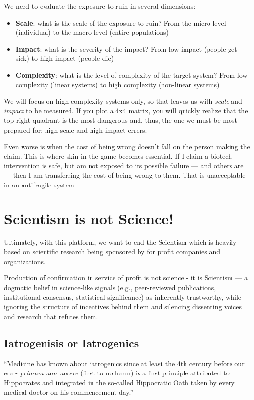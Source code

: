 \documentclass{article}
\begin{document}
We need to evaluate the exposure to ruin in several dimensions:

\begin{itemize}
	\item \textbf{Scale}: what is the scale of the exposure to ruin? From the micro level (individual) to the macro level (entire populations)
	\item \textbf{Impact}: what is the severity of the impact? From low-impact (people get sick) to high-impact (people die)
	\item \textbf{Complexity}: what is the level of complexity of the target system? From low complexity (linear systems) to high complexity (non-linear systems)
\end{itemize}

We will focus on high complexity systems only, so that leaves us with \textit{scale} and \textit{impact} to be measured.
If you plot a 4x4 matrix, you will quickly realize that the top right quadrant is the most dangerous and, thus, the one we must be most prepared for: high scale and high impact errors.

Even worse is when the cost of being wrong doesn't fall on the person making the claim. This is where skin in the game becomes essential. If I claim a biotech intervention is safe, but am not exposed to its possible failure — and others are — then I am transferring the cost of being wrong to them. That is unacceptable in an antifragile system.

\section{Scientism is not Science!}
Ultimately, with this platform, we want to end the Scientism which is heavily based on scientific research being sponsored by for profit companies and organizations.

Production of confirmation in service of profit is not science - it is Scientism — a dogmatic belief in science-like signals (e.g., peer-reviewed publications, institutional consensus, statistical significance) as inherently trustworthy, while ignoring the structure of incentives behind them and silencing dissenting voices and research that refutes them.

\subsection{Iatrogenisis or Iatrogenics}

``Medicine has known about iatrogenics since at least the 4th century before our era - \emph{primum non nocere} (first to no harm) is a first principle attributed to Hippocrates and integrated in the so-called Hippocratic Oath taken by every medical doctor on his commencement day.''\cite{Taleb2012}
\end{document}
